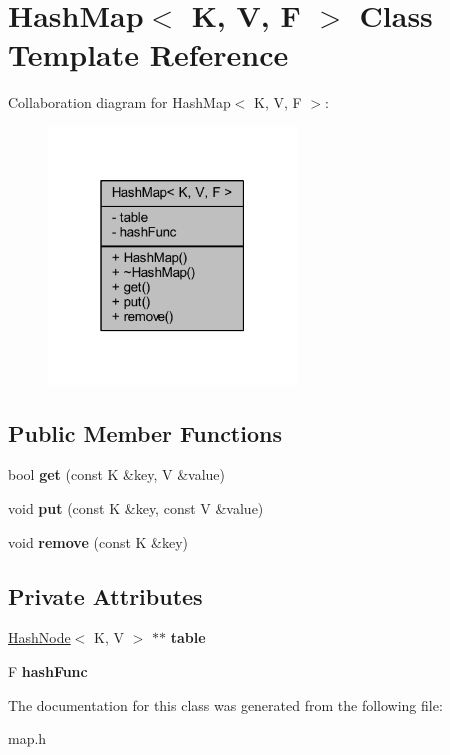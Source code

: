 \hypertarget{class_hash_map}{}\section{Hash\+Map$<$ K, V, F $>$ Class Template Reference}
\label{class_hash_map}


Collaboration diagram for Hash\+Map$<$ K, V, F $>$\+:
\nopagebreak
\begin{figure}[H]
\begin{center}
\leavevmode
\includegraphics[width=187pt]{class_hash_map__coll__graph}
\end{center}
\end{figure}
\subsection*{Public Member Functions}
\begin{DoxyCompactItemize}
\item 
\mbox{\label{class_hash_map_a627196a4ca1c6204f4db2188c52e537c}} 
bool {\bfseries get} (const K \&key, V \&value)
\item 
\mbox{\label{class_hash_map_abdd640f1913bdd84bc76b41ff5b4a2ae}} 
void {\bfseries put} (const K \&key, const V \&value)
\item 
\mbox{\label{class_hash_map_a1f62f6f46ee4312dae040b2fa7eca0ff}} 
void {\bfseries remove} (const K \&key)
\end{DoxyCompactItemize}
\subsection*{Private Attributes}
\begin{DoxyCompactItemize}
\item 
\mbox{\label{class_hash_map_af851fa8f2182b2e69bee7d7bb6a635d7}} 
\hyperlink{class_hash_node}{Hash\+Node}$<$ K, V $>$ $\ast$$\ast$ {\bfseries table}
\item 
\mbox{\label{class_hash_map_aa2ab73d80334926ee420b948b0249c30}} 
F {\bfseries hash\+Func}
\end{DoxyCompactItemize}


The documentation for this class was generated from the following file\+:\begin{DoxyCompactItemize}
\item 
map.\+h\end{DoxyCompactItemize}
